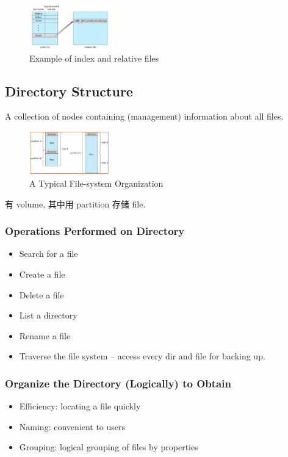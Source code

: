 \begin{figure}[!htb]
    \centering
    \includegraphics[width=0.309\textwidth]{pic/OS10/Example of index and relative files}
    \caption{Example of index and relative files}
\end{figure}


\subsection{Directory Structure}
A collection of nodes containing (management) information about all files. 

\begin{figure}[!htb]
    \centering
    \includegraphics[width=0.309\textwidth]{pic/OS10/A Typical File-system Organization}
    \caption{A Typical File-system Organization}
\end{figure}

有 volume, 其中用 partition 存储 file. 

\subsubsection{Operations Performed on Directory}
\begin{itemize}\scriptsize
    \item Search for a file
    \item Create a file
    \item Delete a file
    \item List a directory
    \item Rename a file
    \item Traverse the file system – access every dir and file for backing up.
\end{itemize}

\subsubsection{Organize the Directory (Logically) to Obtain}
\begin{itemize}
    \item Efficiency: locating a file quickly
    \item Naming: convenient to users
    \item Grouping: logical grouping of files by properties
\end{itemize}

